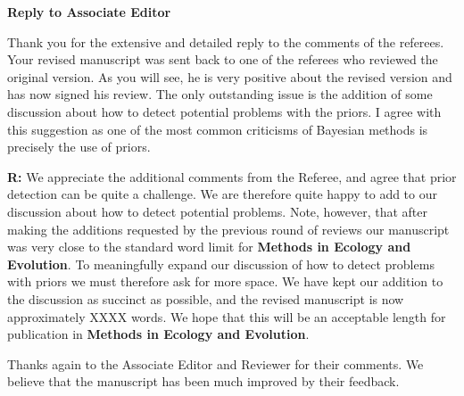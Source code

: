 \documentclass[12pt]{letter}
\newenvironment{refquote}{\bigskip \begin{it}}{\end{it}\smallskip}
\begin{document}
\newpage

\setcounter{page}{1}




{\Large \bf Reply to Associate Editor}


	\begin{refquote}
		
		Thank you for the extensive and detailed reply to the comments of the referees. Your revised manuscript was sent back to one of the referees who reviewed the original version. As you will see, he is very positive about the revised version and has now signed his review. The only outstanding issue is the addition of some discussion about how to detect potential problems with the priors. I agree with this suggestion as one of the most common criticisms of Bayesian methods is precisely the use of priors.

	\end{refquote}


	\textbf{R:} We appreciate the additional comments from the Referee, and agree that prior detection can be quite a challenge. We are therefore quite happy to add to our discussion about how to detect potential problems. Note, however, that after making the additions requested by the previous round of reviews our manuscript was very close to the standard word limit for \textbf{Methods in Ecology and Evolution}. To meaningfully expand our discussion of how to detect problems with priors we must therefore ask for more space. We have kept our addition to the discussion as succinct as possible, and the revised manuscript is now approximately XXXX words. We hope that this will be an acceptable length for publication in \textbf{Methods in Ecology and Evolution}.


	Thanks again to the Associate Editor and Reviewer for their comments. We believe that the manuscript has been much improved by their feedback.
\end{document}
